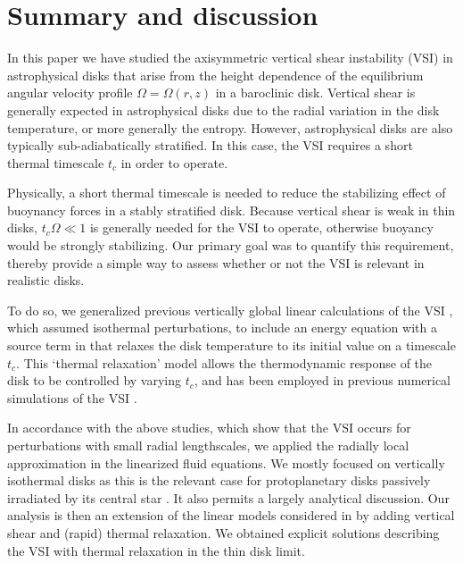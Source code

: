 \section{Summary and discussion}\label{summary}
In this paper we have studied the axisymmetric vertical shear 
instability (VSI) in astrophysical disks that arise from the 
height dependence of the equilibrium angular velocity profile 
$\Omega=\Omega(r,z)$ in a baroclinic disk. Vertical shear is generally
expected in astrophysical disks due to the radial variation in the
disk temperature, or more generally the entropy. However, 
astrophysical disks are also typically sub-adiabatically stratified. 
In this case, the VSI requires a short thermal timescale $t_c$ in
order to operate.  

Physically, a short thermal timescale is needed to reduce the  
stabilizing effect of buoynancy forces in a stably stratified
disk. Because vertical shear is weak in thin disks, $t_c\Omega\ll 1$
is generally needed for the VSI to operate, otherwise buoyancy would
be strongly stabilizing. Our primary goal was to quantify this
requirement, thereby provide a simple way to assess 
whether or not the VSI is relevant in realistic disks. 

To do so, we generalized previous vertically global linear 
calculations of the VSI , which
assumed isothermal perturbations, to include an energy equation with 
a source term in that relaxes the disk
temperature to its initial value on a timescale
$t_c$. This `thermal relaxation' model allows
the thermodynamic response of the disk to be controlled by varying
$t_c$, and has been employed in previous numerical simulations of the
VSI .  

In accordance with the above studies, which show that the VSI occurs for 
perturbations with small radial lengthscales, we applied the 
radially local approximation in the linearized fluid equations. 
We mostly focused on vertically isothermal disks as 
this is the relevant case for protoplanetary disks passively
irradiated by its central star \citep{chiang97}. It also permits a
largely analytical discussion. Our analysis is then an extension of the
linear models considered in \cite{lubow93} by adding vertical shear
and (rapid) thermal relaxation. We obtained explicit solutions 
describing the VSI with thermal relaxation in the thin disk limit.  

